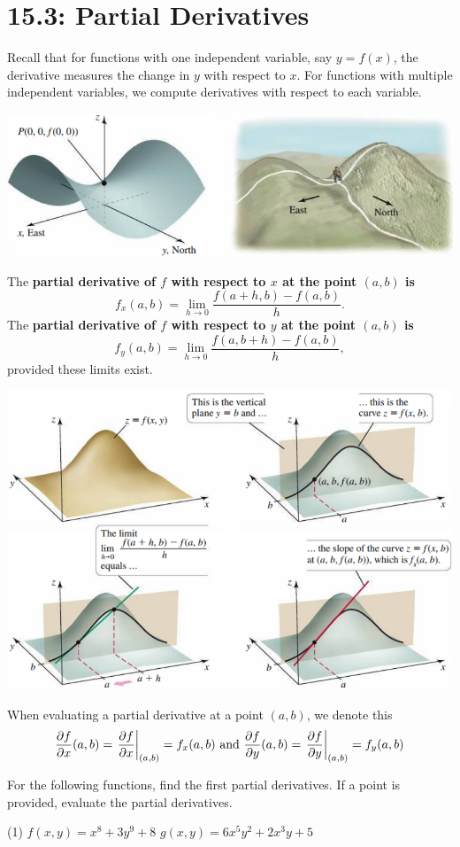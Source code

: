 \documentclass[../mathNotesPreamble]{subfiles}
\begin{document}
\section{15.3: Partial Derivatives}

  Recall that for functions with one independent variable, say $y=f(x)$, the derivative measures the change in $y$ with respect to $x$. For functions with multiple independent variables, we compute derivatives with respect to each variable.

  \begin{center}
    \includegraphics[width=0.45\linewidth]{../images/briggs_15_03/fig15_30}
  \end{center}

  \begin{defn*}
    The \textbf{partial derivative of $f$ with respect to $x$ at the point $(a,b)$ is}
      \[f_x(a,b)=\lim_{h\to 0} \frac{f(a+h,b)-f(a,b)}{h}.\]
    The \textbf{partial derivative of $f$ with respect to $y$ at the point $(a,b)$ is}
      \[f_y(a,b)=\lim_{h\to 0} \frac{f(a,b+h)-f(a,b)}{h},\]
    provided these limits exist.
  \end{defn*}

  \begin{center}
    \includegraphics[width=0.5\linewidth]{../images/briggs_15_03/fig15_31}
  \end{center}
  \pagebreak

  When evaluating a partial derivative at a point $(a,b)$, we denote this
    \[\frac{\partial f}{\partial x}(a,b)=\left.\frac{\partial f}{\partial x}\right|_{(a,b)}=f_x(a,b) \textnormal{ and }\frac{\partial f}{\partial y}(a,b)=\left.\frac{\partial f}{\partial y}\right|_{(a,b)}=f_y(a,b)\]
  \begin{ex*}
    For the following functions, find the first partial derivatives. If a point is provided, evaluate the partial derivatives.
  \end{ex*}
  \begin{tasks}[after-item-skip=\stretch{1}, label=](1)
    \task $f(x,y)=x^8+3y^9+8$
    \task $g(x,y)=6x^5y^2+2x^3y+5$
  \end{tasks}
  \pagebreak
\end{document}
